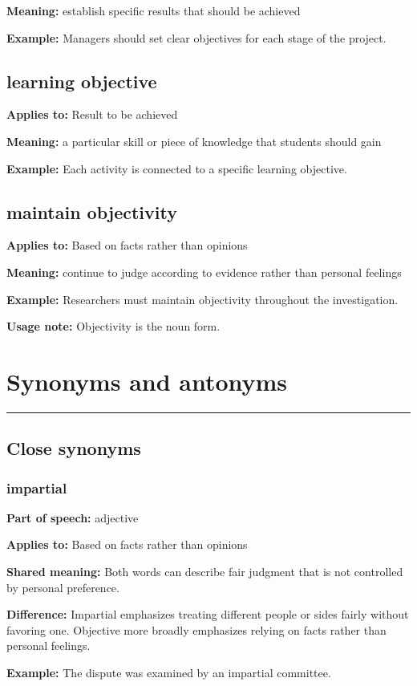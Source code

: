 \documentclass[11pt]{article}
\newcommand{\sectionrule}{\par\vspace{-0.5em}\noindent\textcolor{Accent}{\rule{\linewidth}{0.6pt}}\par}
\begin{document}
\textbf{Meaning:} establish specific results that should be achieved

\textbf{Example:} Managers should set clear objectives for each stage of the project.

\subsection{learning objective}
\textbf{Applies to:} Result to be achieved

\textbf{Meaning:} a particular skill or piece of knowledge that students should gain

\textbf{Example:} Each activity is connected to a specific learning objective.

\subsection{maintain objectivity}
\textbf{Applies to:} Based on facts rather than opinions

\textbf{Meaning:} continue to judge according to evidence rather than personal feelings

\textbf{Example:} Researchers must maintain objectivity throughout the investigation.

\textbf{Usage note:} Objectivity is the noun form.

\section{Synonyms and antonyms}
\sectionrule
\subsection{Close synonyms}
\subsubsection{impartial}
\textbf{Part of speech:} adjective

\textbf{Applies to:} Based on facts rather than opinions

\textbf{Shared meaning:} Both words can describe fair judgment that is not controlled by personal preference.

\textbf{Difference:} Impartial emphasizes treating different people or sides fairly without favoring one. Objective more broadly emphasizes relying on facts rather than personal feelings.

\textbf{Example:} The dispute was examined by an impartial committee.
\end{document}
